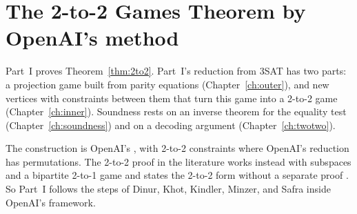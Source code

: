 \part{The 2-to-2 Games Theorem by OpenAI's method}

Part~I proves Theorem~\ref{thm:2to2}. Part~I's reduction from 3SAT has two parts: a projection game built from parity equations (Chapter~\ref{ch:outer}), and new vertices with constraints between them that turn this game into a 2-to-2 game (Chapter~\ref{ch:inner}). Soundness rests on an inverse theorem for the equality test (Chapter~\ref{ch:soundness}) and on a decoding argument (Chapter~\ref{ch:twotwo}).

The construction is OpenAI's \cite[Section~4]{OAI}, with 2-to-2 constraints where OpenAI's reduction has permutations. The 2-to-2 proof in the literature works instead with subspaces and a bipartite 2-to-1 game \cite[Sections~4--5]{DKKMS} and states the 2-to-2 form without a separate proof \cite[Theorem~1.11]{DKKMS}. So Part~I follows the steps of Dinur, Khot, Kindler, Minzer, and Safra inside OpenAI's framework.
